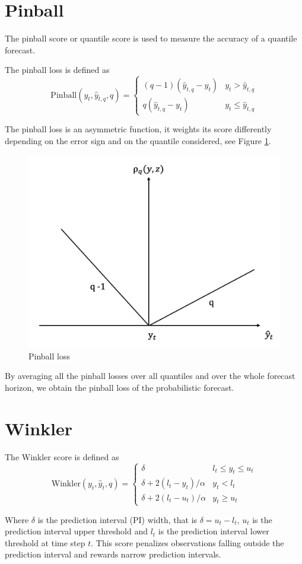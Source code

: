 \section{Pinball}\label{pinball}
The pinball score or quantile score is used to measure the accuracy of a quantile forecast.
\begin{definition}
    The pinball loss is defined as
    $$
    \mathrm{Pinball}(y_{t},\hat{y}_{t,q},q)=
\begin{cases}
(q-1)(\hat{y}_{t,q}-y_{t}) & y_t > \hat{y}_{t,q} \\
q(\hat{y}_{t,q}-y_t) & y_t \leq \hat{y}_{t,q}
\end{cases}
$$
\end{definition}
The pinball loss is an asymmetric function, it weights its score differently depending on the error sign and on the quantile considered, see Figure \ref{fig:pinball}.
\begin{figure}
    \includegraphics[width=\textwidth]{images/pinball_loss.png}
    \caption{Pinball loss}
    \label{fig:pinball}
  \end{figure}
By averaging all the pinball losses over all quantiles and over the whole forecast horizon, we obtain the pinball loss of the probabilistic forecast.
\section{Winkler}
\begin{definition}
    The Winkler score is defined as
    $$
    \mathrm{Winkler}(y_t, \hat{y}_t,q)=\begin{cases}
        \delta & l_{t}\leq y_{t}\leq u_{t}\\
        \delta+2(l_{t}-y_{t})/\alpha & y_{t}< l_{t}\\
        \delta+2(l_{t}-u_{t})/\alpha & y_{t} \geq u_{t}
    \end{cases}
    $$
\end{definition}
Where $\delta$ is the prediction interval (PI) width, that is $\delta=u_t-l_t$, $u_t$ is the prediction interval upper threshold and $l_t$ is the prediction interval lower threshold at time step $t$. This score penalizes observations falling outside the prediction interval and rewards narrow prediction intervals.
